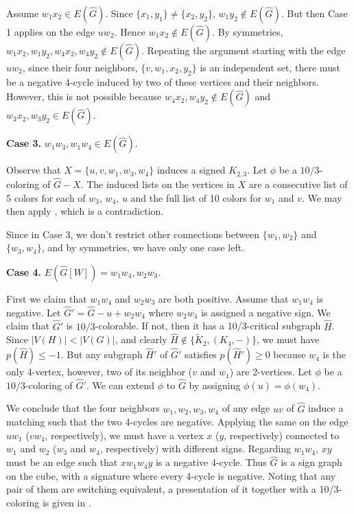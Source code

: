 \documentclass[11pt,a4paper]{article}
\makeatletter
\renewenvironment{proof}[1][\proofname]{\par
	\pushQED{\qed}%
	\normalfont \topsep6\p@\@plus6\p@\relax
	\trivlist
	\item[\hskip\labelsep
	\bfseries
	#1\@addpunct{.}]\ignorespaces
}{%
	\popQED\endtrivlist\@endpefalse
}
\theoremstyle{definition}
\makeatother
\begin{document}
\begin{proof}
Assume $w_{1}x_{2}\in E(\widehat{G})$. Since $\{x_{1}, y_{1}\} \neq \{x_{2}, y_{2}\}$,  $w_{1}y_{2}\notin E(\widehat{G})$. But then Case 1 applies on  the edge $uw_{2}$. Hence $w_{1}x_{2}\notin E(\widehat{G})$. By symmetries, $w_{1}x_{2}, w_{1}y_{2}, w_{4}x_{2}, w_{4}y_{2}\notin E(\widehat{G})$.  
Repeating the argument starting with the edge $uw_{2}$, since their four neighbors, $\{v, w_{1}, x_{2}, y_{2}\}$ is an independent set, there must be a negative 4-cycle  induced by two of these vertices and their neighbors. However, this is not possible because $w_{4}x_{2}, w_{4}y_{2}\notin E(\widehat{G})$ and  $w_{3}x_{2}, w_{3}y_{2}\in E(\widehat{G})$. 


	
	\textbf{Case 3.} $w_1w_3, w_1w_4\in E(\widehat{G})$. 
	
	Observe that $X=\{u,v,w_1,w_3,w_4\}$ induces a signed $K_{2,3}$. Let $\phi$  be a $10/3$-coloring of $\widehat{G}-X$. The induced lists on the vertices in $X$ are a consecutive list of 5 colors for each of $w_{3}$, $w_{4}$, $u$ and the full list of 10 colors for $w_{1}$ and $v$. We may then apply , which is a contradiction.
	
	Since in Case 3,  we don't restrict other connections between $\{w_{1}, w_{2}\}$ and $\{w_{3}, w_{4}\}$, and by symmetries, we have only one case left. 
	
	\textbf{Case 4.} $E(\widehat{G}[W])=w_1w_4, w_2w_3$. 
	
	First we claim that $w_1w_4$ and $w_2w_3$ are both positive. Assume that $w_1w_4$ is negative.  Let $\widehat{G}'=\widehat{G}-u+w_2w_4$ where $w_2w_4$ is assigned a negative sign. We claim that $\widehat{G}'$ is $10/3$-colorable. If not, then it has a 10/3-critical subgraph $\widehat{H}$. Since $|V(H)|<|V(G)|$, and clearly $\widehat{H}\notin \{\widetilde{K}_2, (K_4,-)\}$, we must have  $p(\widehat{H})\leq -1$. But any subgraph $\widehat{H}'$ of $\widehat{G}'$ satisfies $p(\widehat{H}')\geq 0$ because   $w_{4}$ is the only 4-vertex, however, two of its neighbor ($v$ and $w_{1}$) are  2-vertices. Let $\phi$ be a $10/3$-coloring of $\widehat{G}'$. We can extend $\phi$ to $\widehat{G}$ by assigning $\phi(u)=\phi(w_4)$. 
	
	We conclude that the four neighbors $w_1,w_2,w_3,w_4$ of any edge $uv$ of $\widehat{G}$ induce a matching such that the two 4-cycles are negative. Applying the same on the edge $uw_1$ ($vw_4$, respectively), we must have a vertex $x$ ($y$, respectively) connected to $w_1$ and $w_2$ ($w_3$ and $w_4$, respectively) with different signs. Regarding $w_1w_4$, $xy$ must be an edge such that $xw_1w_4y$ is a negative 4-cycle. Thus $\widehat{G}$ is a sign graph on the cube,  with a signature where every 4-cycle is negative. Noting that any pair of them are switching equivalent, a presentation of it together with a 10/3-coloring is given in . 
\end{proof}
\end{document}
